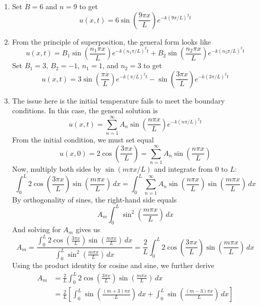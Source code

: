 \documentclass[a4paper]{article}
\begin{document}
\begin{enumerate}[label=(\alph*)]
	\item Set \( B = 6 \) and \( n = 9 \) to get
	\[
		u \!\left( x,t \right) = 6 \sin\!\left(\frac{9 \pi x}{L}\right)e^{-k \!\left( 9 \pi / L \right)^{2}t} 
	\]
	\item From the principle of superposition, the general form looks like
	\[
		u \!\left( x,t \right) = B_{1}\sin\!\left(\frac{n_{1}\pi x}{L}\right)e^{-k \!\left( n_{1}\pi / L \right)^{2}t} + B_{2}\sin\!\left(\frac{n_{2}\pi x}{L}\right)e^{-k \!\left( n_{2}\pi / L \right)^{2}t} 
	\]
	Set \( B_{1} = 3 \), \( B_{2} = -1 \), \( n_{1} = 1 \), and \( n_{2} = 3 \) to get
	\[
		u \!\left( x,t \right) = 3 \sin\!\left(\frac{\pi x}{L}\right)e^{-k \!\left( \pi / L \right)^{2}t} - \sin\!\left(\frac{3 \pi x}{L}\right)e^{-k \!\left( 3 \pi / L \right)^{2}t} 
	\]
	\item The issue here is the initial temperature fails to meet the boundary conditions.
	In this case, the general solution is
	\[
		u \!\left( x,t \right) = \sum^{\infty}_{n=1} A_{n}\sin\!\left(\frac{n \pi x}{L}\right)e^{-k \!\left( n \pi / L \right)^{2}t} 
	\]
	From the initial condition, we must set equal
	\[
		 u \!\left( x,0 \right) = 2 \cos\!\left(\frac{3 \pi x}{L}\right) = \sum^{\infty}_{n=1} A_{n}\sin\!\left(\frac{n \pi x}{L}\right)
	\]
	Now, multiply both sides by \( \sin\!\left(m \pi x / L\right) \) and integrate from \( 0 \) to \( L \):
	\[
		\int^{L}_{0} 2 \cos\!\left(\frac{3 \pi x}{L}\right)\sin\!\left(\frac{m \pi x}{L}\right) \, dx = \int^{L}_{0} \sum^{\infty}_{n=1} A_{n}\sin\!\left(\frac{n \pi x}{L}\right)\sin\!\left(\frac{m \pi x}{L}\right) \, dx  
	\]
	By orthogonality of sines, the right-hand side equals
	\[
		A_{m}\int^{L}_{0} \sin^{2}\!\left(\frac{m \pi x}{L}\right) \, dx 
	\]
	And solving for \( A_{m} \) gives us
	\[
		A_{m} = \frac{\int^{L}_{0} 2 \cos\!\left(\frac{3 \pi x}{L}\right)\sin\!\left(\frac{m \pi x}{L}\right) \, dx}{\int^{L}_{0} \sin^{2}\!\left(\frac{m \pi x}{L}\right) \, dx} = \frac{2}{L}\int^{L}_{0} 2 \cos\!\left(\frac{3 \pi x}{L}\right)\sin\!\left(\frac{m \pi x}{L}\right) \, dx 
	\]
	Using the product identity for cosine and sine, we further derive
	\begin{align*}
		A_{m} & = \frac{2}{L}\int^{L}_{0} 2 \cos\!\left(\frac{3 \pi x}{L}\right)\sin\!\left(\frac{m \pi x}{L}\right) \, dx \\
		& = \frac{2}{L}\!\left[ \int^{L}_{0} \sin\!\left(\frac{\!\left( m + 3 \right)\pi x}{L}\right) \, dx + \int^{L}_{0} \sin\!\left(\frac{\!\left( m - 3 \right)\pi x}{L}\right) \, dx \right] \\

\end{align*}
\end{enumerate}
\end{document}
